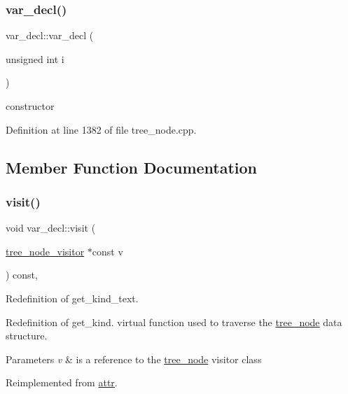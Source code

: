 \subsubsection{\texorpdfstring{var\+\_\+decl()}{var\_decl()}}
{\footnotesize\ttfamily var\+\_\+decl\+::var\+\_\+decl (\begin{DoxyParamCaption}\item[{unsigned int}]{i }\end{DoxyParamCaption})\hspace{0.3cm}{\ttfamily [explicit]}}



constructor 



Definition at line 1382 of file tree\+\_\+node.\+cpp.



\subsection{Member Function Documentation}
\mbox{\label{structvar__decl_ad28f066d3483ec9ca4b7839c1af19c6f}} 
\subsubsection{\texorpdfstring{visit()}{visit()}}
{\footnotesize\ttfamily void var\+\_\+decl\+::visit (\begin{DoxyParamCaption}\item[{\hyperlink{classtree__node__visitor}{tree\+\_\+node\+\_\+visitor} $\ast$const}]{v }\end{DoxyParamCaption}) const\hspace{0.3cm}{\ttfamily [override]}, {\ttfamily [virtual]}}



Redefinition of get\+\_\+kind\+\_\+text. 

Redefinition of get\+\_\+kind. virtual function used to traverse the \hyperlink{classtree__node}{tree\+\_\+node} data structure. 
\begin{DoxyParams}{Parameters}
{\em v} & is a reference to the \hyperlink{classtree__node}{tree\+\_\+node} visitor class \\
\hline
\end{DoxyParams}


Reimplemented from \hyperlink{structattr_a75ba987f0d5d6b50e0aee15d25b98a5b}{attr}.



